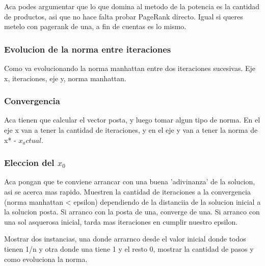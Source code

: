Aca podes argumentar que lo que domina al metodo de la potencia es la cantidad de productos, asi que no hace falta probar PageRank directo. Igual si queres metelo con pagerank de una, a fin de cuentas es lo mismo.

\subsubsection{Evolucion de la norma entre iteraciones}
Como va evolucionando la norma manhattan entre dos iteraciones sucesivas. Eje x, iteraciones, eje y, norma manhattan.

\subsubsection{Convergencia}
Aca tienen que calcular el vector posta, y luego tomar algun tipo de norma. En el eje x van a tener la cantidad de iteraciones, y en el eje y van a tener la norma de x* - $x_actual$.

\subsubsection{Eleccion del $x_0$}

Aca pongan que te conviene arrancar con una buena 'adivinanza' de la solucion, asi se acerca mas rapido. Muestren la cantidad de iteraciones a la convergencia (norma manhattan < epsilon) dependiendo de la distanciia de la solucion inicial a la solucion posta. Si arranco con la posta de una, converge de una. Si arranco con una sol asquerosa inicial, tarda mas iteraciones en cumplir nuestro epsilon.

Mostrar dos instancias, una donde arrarnco desde el valor inicial donde todos tienen 1/n y otra donde una tiene 1 y el resto 0, mostrar la cantidad de pasos y como evoluciona la norma.


